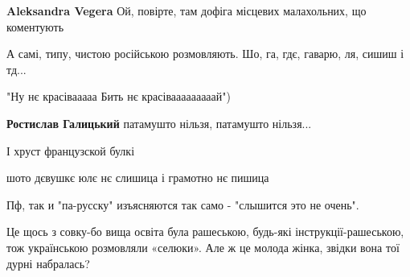 \begin{itemize}
{\begin{itemize}
{\textbf{Aleksandra Vegera} Ой, повірте, там дофіга місцевих малахольних, що коментують
}\end{itemize}

 
А самі, типу, чистою російською розмовляють. Шо, га, гдє, гаварю, ля, сишиш і тд...

 
"Ну нє красівааааа
Бить нє красівааааааааай")

\begin{itemize}{
 
\textbf{Ростислав Галицький} патамушто нільзя, патамушто нільзя...

 
І хруст французской булкі
}\end{itemize}

 

шото дєвушкє юлє нє слишица і грамотно нє пишица

 
Пф, так и "па-русску" изъясняются так само - "слышится это не очень".

 

Це щось з совку-бо вища освіта була рашеською, будь-які інструкції-рашеською, тож
українською розмовляли «селюки». Але ж це молода жінка, звідки вона тої дурні
набралась?

}\end{itemize}

